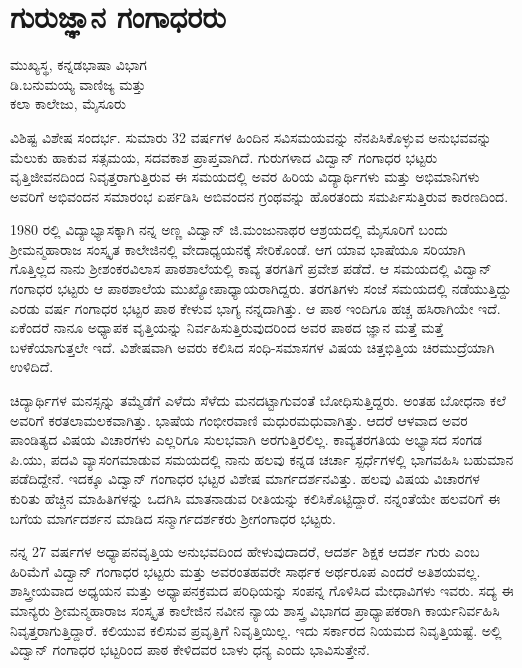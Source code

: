 \chapter{ಗುರುಜ್ಞಾನ ಗಂಗಾಧರರು}

\begin{center}
\smallskip
 ಮುಖ್ಯಸ್ಥ, ಕನ್ನಡಭಾಷಾ ವಿಭಾಗ\\
ಡಿ.ಬನುಮಯ್ಯ ವಾಣಿಜ್ಯ ಮತ್ತು \\
ಕಲಾ ಕಾಲೇಜು, ಮೈಸೂರು
\end{center}

ವಿಶಿಷ್ಟ ವಿಶೇಷ ಸಂದರ್ಭ. ಸುಮಾರು 32 ವರ್ಷಗಳ ಹಿಂದಿನ ಸವಿಸಮಯವನ್ನು ನೆನಪಿಸಿಕೊಳ್ಳುವ ಅನುಭವವನ್ನು ಮೆಲುಕು ಹಾಕುವ ಸತ್ಸಮಯ, ಸದವಕಾಶ ಪ್ರಾಪ್ತವಾಗಿದೆ. ಗುರುಗಳಾದ ವಿದ್ವಾನ್ ಗಂಗಾಧರ ಭಟ್ಟರು ವೃತ್ತಿಜೀವನದಿಂದ ನಿವೃತ್ತರಾಗುತ್ತಿರುವ ಈ ಸಮಯದಲ್ಲಿ ಅವರ ಹಿರಿಯ ವಿದ್ಯಾರ್ಥಿಗಳು ಮತ್ತು ಅಭಿಮಾನಿಗಳು ಅವರಿಗೆ ಅಭಿವಂದನ ಸಮಾರಂಭ ಏರ್ಪಡಿಸಿ ಅಬಿವಂದನ ಗ್ರಂಥವನ್ನು ಹೊರತಂದು ಸಮರ್ಪಿಸುತ್ತಿರುವ ಕಾರಣದಿಂದ.

1980 ರಲ್ಲಿ ವಿದ್ಯಾಭ್ಯಾಸಕ್ಕಾಗಿ ನನ್ನ ಅಣ್ಣ ವಿದ್ವಾನ್ ಜಿ.ಮಂಜುನಾಥರ ಆಶ್ರಯದಲ್ಲಿ ಮೈಸೂರಿಗೆ ಬಂದು ಶ್ರೀಮನ್ಮಹಾರಾಜ ಸಂಸ್ಕೃತ ಕಾಲೇಜಿನಲ್ಲಿ ವೇದಾಧ್ಯಯನಕ್ಕೆ ಸೇರಿಕೊಂಡೆ. ಆಗ ಯಾವ ಭಾಷೆಯೂ ಸರಿಯಾಗಿ ಗೊತ್ತಿಲ್ಲದ ನಾನು ಶ್ರೀಶಂಕರವಿಲಾಸ ಪಾಠಶಾಲೆಯಲ್ಲಿ ಕಾವ್ಯ ತರಗತಿಗೆ ಪ್ರವೇಶ ಪಡೆದೆ. ಆ ಸಮಯದಲ್ಲಿ ವಿದ್ವಾನ್ ಗಂಗಾಧರ ಭಟ್ಟರು ಆ ಪಾಠಶಾಲೆಯ ಮುಖ್ಯೋಪಾಧ್ಯಾಯರಾಗಿದ್ದರು. ತರಗತಿಗಳು ಸಂಜೆ ಸಮಯದಲ್ಲಿ ನಡೆಯುತ್ತಿದ್ದು ಎರಡು ವರ್ಷ ಗಂಗಾಧರ ಭಟ್ಟರ ಪಾಠ ಕೇಳುವ ಭಾಗ್ಯ ನನ್ನದಾಗಿತ್ತು. ಆ ಪಾಠ ಇಂದಿಗೂ ಹಚ್ಚ ಹಸಿರಾಗಿಯೇ ಇದೆ. ಏಕೆಂದರೆ ನಾನೂ ಅಧ್ಯಾಪಕ ವೃತ್ತಿಯನ್ನು ನಿರ್ವಹಿಸುತ್ತಿರುವುದರಿಂದ ಅವರ ಪಾಠದ ಜ್ಞಾನ ಮತ್ತೆ ಮತ್ತೆ ಬಳಕೆಯಾಗುತ್ತಲೇ ಇದೆ. ವಿಶೇಷವಾಗಿ ಅವರು ಕಲಿಸಿದ ಸಂಧಿ-ಸಮಾಸಗಳ ವಿಷಯ ಚಿತ್ತಭಿತ್ತಿಯ ಚಿರಮುದ್ರೆಯಾಗಿ ಉಳಿದಿದೆ. 

ಚಿದ್ಯಾರ್ಥಿಗಳ ಮನಸ್ಸನ್ನು ತಮ್ಮೆಡೆಗೆ ಎಳೆದು ಸೆಳೆದು ಮನದಟ್ಟಾಗುವಂತೆ ಬೋಧಿಸುತ್ತಿದ್ದರು. ಅಂತಹ ಬೋಧನಾ ಕಲೆ ಅವರಿಗೆ ಕರತಲಾಮಲಕವಾಗಿತ್ತು. ಭಾಷೆಯ ಗಂಭೀರವಾಣಿ ಮಧುರಮಧುವಾಗಿತ್ತು. ಆದರೆ ಆಳವಾದ ಅವರ ಪಾಂಡಿತ್ಯದ ವಿಷಯ ವಿಚಾರಗಳು ಎಲ್ಲರಿಗೂ ಸುಲಭವಾಗಿ ಅರಗುತ್ತಿರಲಿಲ್ಲ. ಕಾವ್ಯತರಗತಿಯ ಅಭ್ಯಾಸದ ಸಂಗಡ ಪಿ.ಯು, ಪದವಿ ವ್ಯಾಸಂಗಮಾಡುವ ಸಮಯದಲ್ಲಿ ನಾನು ಹಲವು ಕನ್ನಡ ಚರ್ಚಾ ಸ್ಪರ್ಧೆಗಳಲ್ಲಿ ಭಾಗವಹಿಸಿ ಬಹುಮಾನ ಪಡೆದಿದ್ದೇನೆ. ಇದಕ್ಕೂ ವಿದ್ವಾನ್ ಗಂಗಾಧರ ಭಟ್ಟರ ವಿಶೇಷ ಮಾರ್ಗದರ್ಶನವಿತ್ತು. ಹಲವು ವಿಷಯ ವಿಚಾರಗಳ ಕುರಿತು ಹೆಚ್ಚಿನ ಮಾಹಿತಿಗಳನ್ನು ಒದಗಿಸಿ ಮಾತನಾಡುವ ರೀತಿಯನ್ನು ಕಲಿಸಿಕೊಟ್ಟಿದ್ದಾರೆ. ನನ್ನಂತೆಯೇ ಹಲವರಿಗೆ ಈ ಬಗೆಯ ಮಾರ್ಗದರ್ಶನ ಮಾಡಿದ ಸನ್ಮಾರ್ಗದರ್ಶಕರು ಶ್ರೀಗಂಗಾಧರ ಭಟ್ಟರು. 

ನನ್ನ 27 ವರ್ಷಗಳ ಅಧ್ಯಾಪನವೃತ್ತಿಯ ಅನುಭವದಿಂದ ಹೇಳುವುದಾದರೆ, ಆದರ್ಶ ಶಿಕ್ಷಕ ಆದರ್ಶ ಗುರು ಎಂಬ ಹಿರಿಮೆಗೆ ವಿದ್ವಾನ್ ಗಂಗಾಧರ ಭಟ್ಟರು ಮತ್ತು ಅವರಂತಹವರೇ ಸಾರ್ಥಕ ಅರ್ಥರೂಪ ಎಂದರೆ ಅತಿಶಯವಲ್ಲ. ಶಾಸ್ತ್ರೀಯವಾದ ಅಧ್ಯಯನ ಮತ್ತು ಅಧ್ಯಾಪನಕ್ರಮದ ಪರಿಧಿಯನ್ನು ಸಂಪನ್ನ ಗೊಳಿಸಿದ ಮೇಧಾವಿಗಳು ಇವರು. ಸದ್ಯ ಈ ಮಾನ್ಯರು ಶ್ರೀಮನ್ಮಹಾರಾಜ ಸಂಸ್ಕೃತ ಕಾಲೇಜಿನ ನವೀನ ನ್ಯಾಯ ಶಾಸ್ತ್ರ ವಿಭಾಗದ ಪ್ರಾಧ್ಯಾಪಕರಾಗಿ ಕಾರ್ಯನಿರ್ವಹಿಸಿ ನಿವೃತ್ತರಾಗುತ್ತಿದ್ದಾರೆ. ಕಲಿಯುವ ಕಲಿಸುವ ಪ್ರವೃತ್ತಿಗೆ ನಿವೃತ್ತಿಯಿಲ್ಲ. ಇದು ಸರ್ಕಾರದ ನಿಯಮದ ನಿವೃತ್ತಿಯಷ್ಟೆ. ಅಲ್ಲಿ ವಿದ್ವಾನ್ ಗಂಗಾಧರ ಭಟ್ಟರಿಂದ ಪಾಠ ಕೇಳಿದವರ ಬಾಳು ಧನ್ಯ ಎಂದು ಭಾವಿಸುತ್ತೇನೆ.

